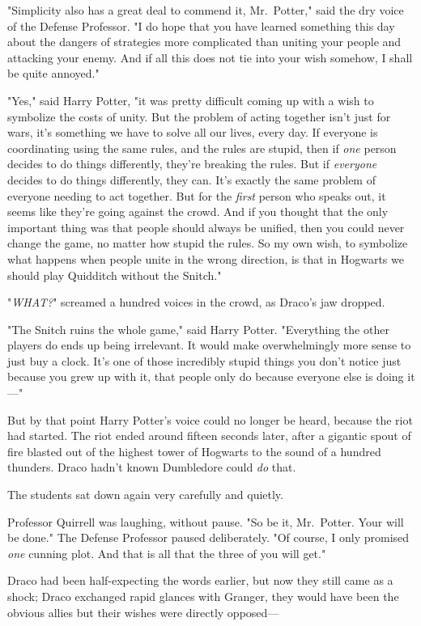 "Simplicity also has a great deal to commend it, Mr.~Potter," said the dry
voice of the Defense Professor. "I do hope that you have learned something this
day about the dangers of strategies more complicated than uniting your people
and attacking your enemy. And if all this does not tie into your wish somehow,
I shall be quite annoyed."

"Yes," said Harry Potter, "it was pretty difficult coming up with a wish to
symbolize the costs of unity. But the problem of acting together isn't just for
wars, it's something we have to solve all our lives, every day. If everyone is
coordinating using the same rules, and the rules are stupid, then if \emph{one}
person decides to do things differently, they're breaking the rules. But if
\emph{everyone} decides to do things differently, they can. It's exactly the
same problem of everyone needing to act together. But for the \emph{first}
person who speaks out, it seems like they're going against the crowd. And if
you thought that the only important thing was that people should always be
unified, then you could never change the game, no matter how stupid the rules.
So my own wish, to symbolize what happens when people unite in the wrong
direction, is that in Hogwarts we should play Quidditch without the Snitch."

"\emph{WHAT?}" screamed a hundred voices in the crowd, as Draco's jaw dropped.

"The Snitch ruins the whole game," said Harry Potter. "Everything the other
players do ends up being irrelevant. It would make overwhelmingly more sense to
just buy a clock. It's one of those incredibly stupid things you don't notice
just because you grew up with it, that people only do because everyone else is
doing it---"

But by that point Harry Potter's voice could no longer be heard, because the
riot had started.
\later
The riot ended around fifteen seconds later, after a gigantic spout of fire
blasted out of the highest tower of Hogwarts to the sound of a hundred
thunders. Draco hadn't known Dumbledore could \emph{do} that.

The students sat down again very carefully and quietly.

Professor Quirrell was laughing, without pause. "So be it, Mr.~Potter. Your
will be done." The Defense Professor paused deliberately. "Of course, I only
promised \emph{one} cunning plot. And that is all that the three of you will
get."

Draco had been half-expecting the words earlier, but now they still came as a
shock; Draco exchanged rapid glances with Granger, they would have been the
obvious allies but their wishes were directly opposed---

